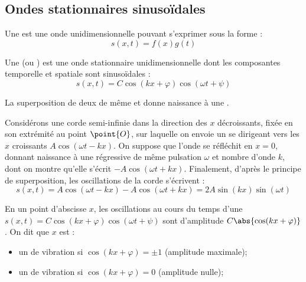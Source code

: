 \subsection{Ondes stationnaires sinusoïdales}

\begin{definition}
Une  est une onde unidimensionnelle pouvant s'exprimer sous la forme :
\[s(x, t) = f(x) g(t)\] 
\end{definition}

\begin{definition}
Une  (ou ) est une onde stationnaire unidimensionnelle dont les composantes temporelle et spatiale sont sinusoïdales :
\[s(x, t) = C \cos(kx + \varphi) \cos(\omega t + \psi)\]
\end{definition}

\begin{propriete}
La superposition de deux  de même  et  donne naissance à une .
\end{propriete}

\begin{exemple}
Considérons une corde semi-infinie dans la direction des $x$ décroissants, fixée en son extrémité au point $\point{O}$, sur laquelle on envoie un  se dirigeant vers les $x$ croissants $A \cos(\omega t - kx)$. On suppose que l'onde se réfléchit en $x = 0$, donnant naissance à une  régressive de même pulsation $\omega$ et nombre d'onde $k$, dont on montre qu'elle s'écrit $-A \cos(\omega t + kx)$. Finalement, d'après le principe de superposition, les oscillations de la corde s'écrivent :
\[s(x, t) = A \cos(\omega t - kx) - A \cos(\omega t + kx) = 2A \sin(kx) \sin(\omega t)\]
\end{exemple}

\begin{vocabulaire}
En un point d'abscisse $x$, les oscillations au cours du temps d'une  $s(x, t) = C \cos(kx + \varphi) \cos(\omega t + \psi)$ sont d'amplitude $C \abs{\cos(kx + \varphi)}$. On dit que $x$ est :
\begin{itemize}
\item un  de vibration si $\cos(kx + \varphi) = \pm 1$ (amplitude maximale);

\item un  de vibration si $\cos(kx + \varphi) = 0$ (amplitude nulle);
\end{itemize}
\end{vocabulaire}

